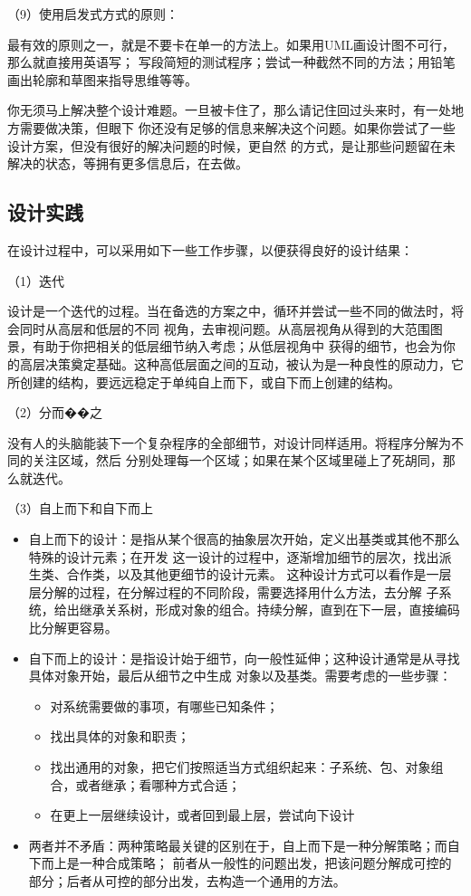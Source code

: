 \documentclass{article}
\begin{document}
\par
（9）使用启发式方式的原则：
\par
最有效的原则之一，就是不要卡在单一的方法上。如果用UML画设计图不可行，那么就直接用英语写；
写段简短的测试程序；尝试一种截然不同的方法；用铅笔画出轮廓和草图来指导思维等等。
\par
你无须马上解决整个设计难题。一旦被卡住了，那么请记住回过头来时，有一处地方需要做决策，但眼下
你还没有足够的信息来解决这个问题。如果你尝试了一些设计方案，但没有很好的解决问题的时候，更自然
的方式，是让那些问题留在未解决的状态，等拥有更多信息后，在去做。

\subsection{设计实践}
在设计过程中，可以采用如下一些工作步骤，以便获得良好的设计结果：
\par
（1）迭代
\par
设计是一个迭代的过程。当在备选的方案之中，循环并尝试一些不同的做法时，将会同时从高层和低层的不同
视角，去审视问题。从高层视角从得到的大范围图景，有助于你把相关的低层细节纳入考虑；从低层视角中
获得的细节，也会为你的高层决策奠定基础。这种高低层面之间的互动，被认为是一种良性的原动力，它
所创建的结构，要远远稳定于单纯自上而下，或自下而上创建的结构。

\par
（2）分而��之
\par
没有人的头脑能装下一个复杂程序的全部细节，对设计同样适用。将程序分解为不同的关注区域，然后
分别处理每一个区域；如果在某个区域里碰上了死胡同，那么就迭代。

\par
（3）自上而下和自下而上
\begin{itemize}
    \item 自上而下的设计：是指从某个很高的抽象层次开始，定义出基类或其他不那么特殊的设计元素；在开发
    这一设计的过程中，逐渐增加细节的层次，找出派生类、合作类，以及其他更细节的设计元素。
    这种设计方式可以看作是一层层分解的过程，在分解过程的不同阶段，需要选择用什么方法，去分解
    子系统，给出继承关系树，形成对象的组合。持续分解，直到在下一层，直接编码比分解更容易。
    \item 自下而上的设计：是指设计始于细节，向一般性延伸；这种设计通常是从寻找具体对象开始，最后从细节之中生成
    对象以及基类。需要考虑的一些步骤：
    \begin{itemize}
        \item 对系统需要做的事项，有哪些已知条件；
        \item 找出具体的对象和职责；
        \item 找出通用的对象，把它们按照适当方式组织起来：子系统、包、对象组合，或者继承；看哪种方式合适；
        \item 在更上一层继续设计，或者回到最上层，尝试向下设计
    \end{itemize}
    \item 两者并不矛盾：两种策略最关键的区别在于，自上而下是一种分解策略；而自下而上是一种合成策略；
    前者从一般性的问题出发，把该问题分解成可控的部分；后者从可控的部分出发，去构造一个通用的方法。
\end{itemize}
\end{document}
